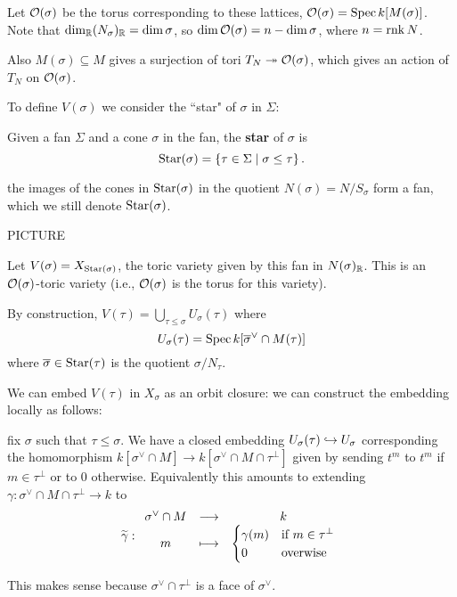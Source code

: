 Let $\mathcal{O}(\sigma)$ be the torus corresponding to these lattices, $\mathcal{O}(\sigma)=\operatorname{Spec} k[M(\sigma)]$. Note that $\dim_{\mathbb{R}} (N_\sigma)_{\mathbb{R}}=\dim \sigma$, so $\dim \mathcal{O}(\sigma)=n-\dim \sigma$, where $n=\operatorname{rnk} N$.

Also $M(\sigma)\subseteq M$ gives a surjection of tori $T_N\twoheadrightarrow \mathcal{O}(\sigma)$, which gives an action of $T_N$ on $\mathcal{O}(\sigma)$.


To define $V(\sigma)$ we consider the ``star" of $\sigma$ in $\Sigma$:
\begin{definition}[]
Given a fan $\Sigma$ and a cone $\sigma$ in the fan, the \textbf{star} of $\sigma$ is
\[\operatorname{Star}(\sigma)=\left\{{\tau\in\Sigma\mid \sigma\leq \tau}\right\}.\]
\end{definition}

\begin{remark}
the images of the cones in $\operatorname{Star}(\sigma)$ in the quotient $N(\sigma)=N/S_\sigma$ form a fan, which we still denote $\operatorname{Star}(\sigma)$.


PICTURE 
\end{remark}

Let $V(\sigma)=X_{\operatorname{Star}(\sigma)}$, the toric variety given by this fan in $N(\sigma)_{\mathbb{R}}$. This is an $\mathcal{O}(\sigma)$-toric variety (i.e., $\mathcal{O}(\sigma)$ is the torus for this variety).

By construction, $V(\tau)=\bigcup_{\tau\leq \sigma}U_\sigma(\tau)$ where
\[U_\sigma(\tau)=\operatorname{Spec} k[\overline{\sigma}^\vee\cap M(\tau)]\]
where $\overline{\sigma}\in \operatorname{Star}(\tau)$ is the quotient $\sigma/N_\tau$.

We can embed $V(\tau)$ in $X_\sigma$ as an orbit closure: we can construct the embedding locally as follows:

fix $\sigma$ such that $\tau\leq \sigma$. We have a closed embedding $U_\sigma(\tau)\hookrightarrow U_\sigma$ corresponding the homomorphism $k[\sigma^\vee\cap M]\to k[\sigma^\vee\cap M\cap \tau^\perp]$ given by sending $t^m$ to $t^m$ if $m\in \tau^\perp$ or to $0$ otherwise. Equivalently this amounts to extending $\gamma:\sigma^\vee\cap M\cap \tau^\perp\to k$ to
\[\widetilde{\gamma}:\begin{array}{ccc} {\sigma^\vee\cap M} & \longrightarrow & {k}\\ {m} & \longmapsto & {\begin{cases}
	\gamma(m) &\text{if }m\in \tau^\perp\\
	0 &\text{overwise}
\end{cases}} \end{array}\]

This makes sense because $\sigma^\vee\cap \tau^\perp$ is a face of $\sigma^\vee$.


